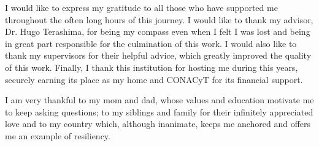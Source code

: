 I would like to express my gratitude to all those who have supported me throughout the often long hours of this journey. 
I would like to thank my advisor, Dr. Hugo Terashima, for being my compass even when I felt I was lost and being in great part responsible for the culmination of this work.
I would also like to thank my supervisors for their helpful advice, which greatly improved the quality of this work. 
Finally, I thank this institution for hosting me during this years, securely earning its place as my home and CONACyT for its financial support.

I am very thankful to my mom and dad, whose values and education motivate me to keep asking questions; to my siblings and family for their infinitely appreciated love and to my country which, although inanimate, keeps me anchored and offers me an example of resiliency. 

